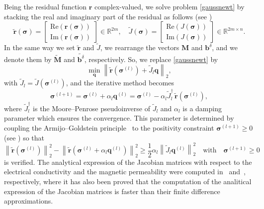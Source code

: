\documentclass[final,leqno]{siamltex}
\newcommand{\R}{{\mathbb R}}
\newcommand{\norm}[1]{\left\| #1 \right\|}
\newcommand{\sigmab}{\boldsymbol{\sigma}}
\newcommand{\Imag}{\mbox{Im}}
\newcommand{\Real}{\mbox{Re}}
\begin{document}
Being the residual function $\mathbf{r}$ complex-valued, we solve 
problem \eqref{gaussnewt} by stacking the real and imaginary part of the
residual as follows (see \cite{ddrv19})
\begin{equation*}
\widetilde{\mathbf{r}}(\sigmab)= \begin{bmatrix}
\Real(\mathbf{r}(\sigmab)) \\
\Imag(\mathbf{r}(\sigmab))
\end{bmatrix} \in \R^{2m}, \quad
\widetilde{J}(\sigmab)=\begin{bmatrix}
\Real(J(\sigmab)) \\
\Imag(J(\sigmab))
\end{bmatrix} \in \R^{2m\times n}.
\end{equation*}
In the same way we set $\widetilde{\mathbf{r}}$ and $\widetilde J$, we rearrange the vectors $\mathbf{M}$ and $\mathbf{b}^\delta$, and we denote them by  $\mathbf{\widetilde M}$ and $\widetilde{\mathbf{b}^\delta}$, respectively. So, we replace \eqref{gaussnewt} by
\begin{equation}
\min_{\mathbf{q}}
\norm{\widetilde{\mathbf{r}}(\sigmab^{(l)})+\widetilde{J}_l \mathbf{q}}_2,
\label{leastsquaresnew}
\end{equation}
with $\widetilde{J}_l=\widetilde{J}(\sigmab^{(l)})$,
and the iterative method becomes
$$
\sigmab^{(l+1)} = \sigmab^{(l)} + \alpha_l\mathbf{q}^{(l)} 
= \sigmab^{(l)} - \alpha_l \widetilde{J}_l^{\dagger} \, \widetilde{\mathbf{r}}(\sigmab^{(l)}),
$$
where $\widetilde{J}_l^{\dagger}$ is the Moore--Penrose pseudoinverse of $\widetilde{J}_l$ and
$\alpha_l$ is a damping parameter which ensures the convergence.
This parameter is determined by coupling the Armijo--Goldstein principle~\cite{bjo96} to
the positivity constraint $\sigmab^{(l+1)}\geq0$ (see \cite{ddr17,dfr14}) so that
\begin{equation}\label{eq:alphal}
\norm{\mathbf{\widetilde r}(\mathbf{\sigma}^{(l)})}_2^2 - \norm{\mathbf{\widetilde r}(\mathbf{\sigma}^{(l)} + \alpha_l \mathbf{q}^{(l)})}_2^2 \geq \frac{1}{2} \alpha_l \norm{\widetilde J_l\mathbf{q}^{(l)}}_2^2\quad\mbox{with}\quad\sigmab^{(l+1)}\geq0
\end{equation}
is verified. The analytical expression of the Jacobian matrices with respect to the electrical conductivity and the magnetic permeability were computed in~\cite{dfr14} and~\cite{ddr17}, respectively, where it has also been proved that the computation of the analitical expression of the Jacobian matrices is faster than their finite difference approximations.
\end{document}
